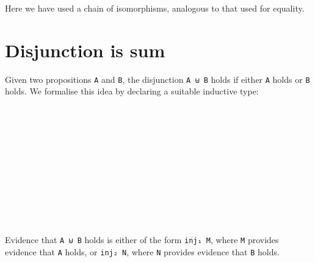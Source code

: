 Here we have used a chain of isomorphisms, analogous to that used for
equality.

\hypertarget{disjunction-is-sum}{%
\section{Disjunction is sum}\label{disjunction-is-sum}}

Given two propositions \texttt{A} and \texttt{B}, the disjunction
\texttt{A\ ⊎\ B} holds if either \texttt{A} holds or \texttt{B} holds.
We formalise this idea by declaring a suitable inductive type:

\begin{fence}
\begin{code}%
\>[0]\AgdaSpace{}%
\AgdaSpace{}%
\AgdaSymbol{(}\AgdaSpace{}%
\AgdaSpace{}%
\AgdaSymbol{:}\AgdaSpace{}%
\AgdaSymbol{)}\AgdaSpace{}%
\AgdaSymbol{:}\AgdaSpace{}%
\AgdaSpace{}%
\<%
\\
%
\\[\AgdaEmptyExtraSkip]%
\>[0][@{}l@{\AgdaIndent{0}}]%
\>[2]\AgdaSpace{}%
\AgdaSymbol{:}\<%
\\
\>[2][@{}l@{\AgdaIndent{0}}]%
\>[6]\<%
\\
%
\>[6]\AgdaComment{-----}\<%
\\
\>[2][@{}l@{\AgdaIndent{0}}]%
\>[4]\AgdaSpace{}%
\AgdaSpace{}%
\AgdaSpace{}%
\<%
\\
%
\\[\AgdaEmptyExtraSkip]%
%
\>[2]\AgdaSpace{}%
\AgdaSymbol{:}\<%
\\
\>[2][@{}l@{\AgdaIndent{0}}]%
\>[6]\<%
\\
%
\>[6]\AgdaComment{-----}\<%
\\
\>[2][@{}l@{\AgdaIndent{0}}]%
\>[4]\AgdaSpace{}%
\AgdaSpace{}%
\AgdaSpace{}%
\<%
\end{code}
\end{fence}

Evidence that \texttt{A\ ⊎\ B} holds is either of the form
\texttt{inj₁\ M}, where \texttt{M} provides evidence that \texttt{A}
holds, or \texttt{inj₂\ N}, where \texttt{N} provides evidence that
\texttt{B} holds.

